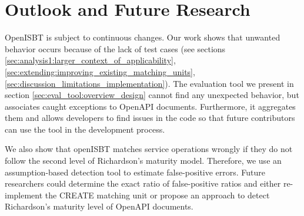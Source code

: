 \section{Outlook and Future Research}
\label{sec:discussion_outlook}
OpenISBT is subject to continuous changes. Our work shows that unwanted behavior occurs because of the lack of test cases (see sections \ref{sec:analysis1:larger_context_of_applicability}, \ref{sec:extending:improving_existing_matching_units}, \ref{sec:discussion_limitations_implementation}). The evaluation tool we present in section \ref{sec:eval_tool:overview_design} cannot find any unexpected behavior, but associates caught exceptions to OpenAPI documents. Furthermore, it aggregates them and allows developers to find issues in the code so that future contributors can use the tool in the development process. 

We also show that openISBT matches service operations wrongly if they do not follow the second level of Richardson’s maturity model. Therefore, we use an assumption-based detection tool to estimate false-positive errors.
Future researchers could determine the exact ratio of false-positive ratios and either re-implement the CREATE matching unit or propose an approach to detect Richardson’s maturity level of OpenAPI documents.